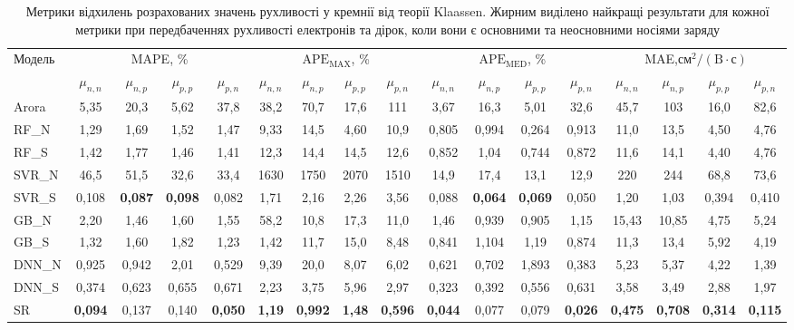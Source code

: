 \documentclass[12pt,a4paper,titlepage,oneside]{book}
\numberwithin{equation}{part}
\begin{document}
\begin{landscape}

\vspace{30mm}

\begin{table}[htbp]
\renewcommand{\arraystretch}{1.5}
\centering
\caption{Метрики відхилень розрахованих значень рухливості у кремнії від теорії Klaassen.
Жирним виділено найкращі результати для кожної метрики при передбаченнях рухливості електронів та дірок, коли вони є основними та неосновними носіями заряду}
\label{tblSum}
\begin{tabular}{|l|c|c|c|c|c|c|c|c|c|c|c|c|c|c|c|c|}
\hline
\multirow{2}{*}{Модель}&\multicolumn{4}{c|}{MAPE, \%}&\multicolumn{4}{c|}{$\mathrm{APE}_\mathrm{MAX}$, \%}
   &\multicolumn{4}{c|}{$\mathrm{APE}_\mathrm{MED}$, \%}&\multicolumn{4}{c|}{MAE,$\text{см}^2/(\text{B}\cdot\text{с})$}\\
\cline{2-17}
&$\mu_{n,n}$&$\mu_{n,p}$&$\mu_{p,p}$&$\mu_{p,n}$&$\mu_{n,n}$&$\mu_{n,p}$&$\mu_{p,p}$&$\mu_{p,n}$
&$\mu_{n,n}$&$\mu_{n,p}$&$\mu_{p,p}$&$\mu_{p,n}$&$\mu_{n,n}$&$\mu_{n,p}$&$\mu_{p,p}$&$\mu_{p,n}$\\
\hline
Arora \cite{Arora1982}&5,35&20,3&5,62&37,8&38,2&70,7&17,6&111&3,67&16,3&5,01&32,6&45,7&103&16,0&82,6\\
\hline
RF\_N &1,29&1,69&1,52&1,47&9,33&14,5&4,60&10,9&0,805&0,994&0,264&0,913&11,0&13,5&4,50&4,76\\
\hline
RF\_S&1,42&1,77&1,46&1,41&12,3&14,4&14,5&12,6&0,852&1,04&0,744&0,872&11,6&14,1&4,40&4,76\\
\hline
SVR\_N&46,5&51,5&32,6&33,4&1630&1750&2070&1510&14,9&17,4&13,1&12,9&220&244&68,8&73,6\\
\hline
SVR\_S&0,108&\textbf{0,087}&\textbf{0,098}&0,082&1,71&2,16&2,26&3,56&0,088&\textbf{0,064}&\textbf{0,069}&0,050&1,20&1,03&0,394&0,410\\
\hline
GB\_N&2,20&1,46&1,60&1,55&58,2&10,8&17,3&11,0&1,46&0,939&0,905&1,15&15,43&10,85&4,75&5,24\\
\hline
GB\_S&1,32&1,60&1,82&1,23&1,42&11,7&15,0&8,48&0,841&1,104&1,19&0,874&11,3&13,4&5,92&4,19\\
\hline
DNN\_N&0,925&0,942&2,01&0,529&9,39&20,0&8,07&6,02&0,621&0,702&1,893&0,383&5,23&5,37&4,22&1,39\\
\hline
DNN\_S&0,374&0,623&0,655&0,671&2,23&3,75&5,96&2,97&0,323&0,392&0,556&0,631&3,58&3,49&2,88&1,97\\
\hline
SR&\textbf{0,094}&0,137&0,140&\textbf{0,050}&\textbf{1,19}&\textbf{0,992}&\textbf{1,48}&\textbf{0,596}&\textbf{0,044}&0,077&0,079&\textbf{0,026}&\textbf{0,475}
   &\textbf{0,708}&\textbf{0,314}&\textbf{0,115}\\
\hline
\end{tabular}
\end{table}
\end{landscape}
\end{document}
